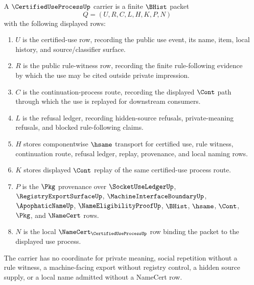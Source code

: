 \begin{definition}
\label{def:certified-use-process-carrier}
A $\CertifiedUseProcessUp$ carrier is a finite $\BHist$ packet
$$
Q=(U,R,C,L,H,K,P,N)
$$
with the following displayed rows:
\begin{enumerate}
\item $U$ is the certified-use row, recording the public use event, its name, item, local history, and source/classifier surface.
\item $R$ is the public rule-witness row, recording the finite rule-following evidence by which the use may be cited outside private impression.
\item $C$ is the continuation-process route, recording the displayed $\Cont$ path through which the use is replayed for downstream consumers.
\item $L$ is the refusal ledger, recording hidden-source refusals, private-meaning refusals, and blocked rule-following claims.
\item $H$ stores componentwise $\hsame$ transport for certified use, rule witness, continuation route, refusal ledger, replay, provenance, and local naming rows.
\item $K$ stores displayed $\Cont$ replay of the same certified-use process route.
\item $P$ is the $\Pkg$ provenance over $\SocketUseLedgerUp$, $\RegistryExportSurfaceUp$, $\MachineInterfaceBoundaryUp$, $\ApophaticNameUp$, $\NameEligibilityProofUp$, $\BHist$, $\hsame$, $\Cont$, $\Pkg$, and $\NameCert$ rows.
\item $N$ is the local $\NameCert_{\CertifiedUseProcessUp}$ row binding the packet to the displayed use process.
\end{enumerate}
The carrier has no coordinate for private meaning, social repetition without a rule witness, a machine-facing export without registry control, a hidden source supply, or a local name admitted without a NameCert row.
\end{definition}

